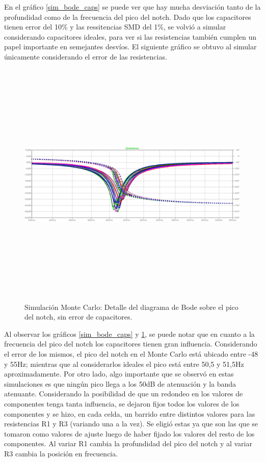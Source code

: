 En el gr\'afico \ref{sim_bode_caps} se puede ver que hay mucha desviaci\'on tanto de la profundidad como de la frecuencia del pico del notch. Dado que los capacitores tienen error del 10\% y las ressitencias SMD del 1\%, se volvi\'o a simular considerando capacitores ideales, para ver si las resistencias tambi\'en cumplen un papel importante en semejantes desv\'ios. El siguiente gr\'afico se obtuvo al simular \'unicamente considerando el error de las resistencias.

 \begin{figure}[H] %
	\centering	\includegraphics[width=12cm,height=12cm,keepaspectratio]{../EJ4/graficos/h_montecarlo_detalle.png}
	\caption{Simulaci\'on Monte Carlo: Detalle del diagrama de Bode sobre el pico del notch, sin error de capacitores.}
	\label{sim_bode_detalle}
\end{figure}

Al observar los gr\'aficos \ref{sim_bode_caps} y \ref{sim_bode_detalle}, se puede notar que en cuanto a la frecuencia del pico del notch los capacitores tienen gran influencia. Considerando el error de los mismos, el pico del notch en el Monte Carlo est\'a ubicado entre -48 y 55Hz; mientras que al considerarlos ideales el pico est\'a entre 50,5 y 51,5Hz aproximadamente. Por otro lado, algo importante que se observ\'o en estas simulaciones es que ning\'un pico llega a los 50dB de atenuaci\'on y la banda atenuante. Considerando la posibilidad de que un redondeo en los valores de componentes tenga tanta influencia, se dejaron fijos todos los valores de los componentes y se hizo, en cada celda, un barrido entre distintos valores para las resistencias R1 y R3 (variando una a la vez). Se eligi\'o estas ya que son las que se tomaron como valores de ajuste luego de haber fijado los valores del resto de los componentes. Al variar R1 cambia la profundidad del pico del notch y al variar R3 cambia la posici\'on en frecuencia. 

